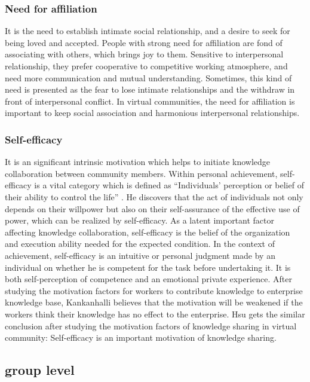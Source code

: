 \documentclass{elsarticle}
\begin{document}
\subsubsection{ Need for affiliation}
\label{sec:need-affiliation}

It is the need to establish intimate social
relationship, and a desire to seek for being loved and
accepted. People with strong need for affiliation are fond of
associating with others, which brings joy to them. Sensitive to
interpersonal relationship, they prefer cooperative to competitive
working atmosphere, and need more communication and mutual
understanding. Sometimes, this kind of need is presented as the fear
to lose intimate relationships and the withdraw in front of
interpersonal conflict. In virtual communities, the need for
affiliation is important to keep social association and harmonious
interpersonal relationships.

\subsubsection{Self-efficacy}
\label{sec:self-efficacy}

It is an significant intrinsic motivation which
helps to initiate knowledge collaboration between community
members.  Within personal
achievement, self-efficacy is a vital category which is defined as
“Individuals’ perception or belief of their ability to control the
life” \cite{bundura1977slt}. He discovers that the act of individuals not only depends
on their willpower but also on their self-assurance of the effective
use of power, which can be realized by self-efficacy. As a latent
important factor affecting knowledge collaboration, self-efficacy is
the belief of the organization and execution ability needed for the
expected condition. In the context of achievement, self-efficacy is an intuitive
or personal judgment made by an individual on whether he is competent
for the task before undertaking it. It is both self-perception of
competence and an emotional private experience. After studying the
motivation factors for workers to contribute knowledge to enterprise
knowledge base,  Kankanhalli believes that the motivation will be
weakened if the workers think their knowledge has no effect to the
enterprise. Hsu gets the similar conclusion after studying the
motivation factors of knowledge sharing in virtual community:
Self-efficacy is an important motivation of knowledge sharing.

\subsection{group level}
\label{sec:group-level}
\end{document}
